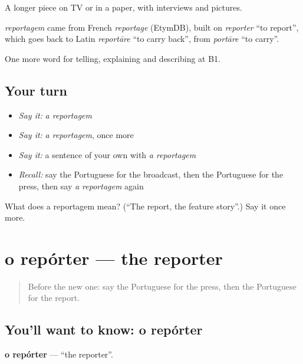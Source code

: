 A longer piece on TV or in a paper, with interviews and pictures.

\begin{cousinweb}
\emph{reportagem} came from French \emph{reportage} (EtymDB), built on \emph{reporter} \textquotedblleft{}to report\textquotedblright{}, which goes back to Latin \emph{reportāre} \textquotedblleft{}to carry back\textquotedblright{}, from \emph{portāre} \textquotedblleft{}to carry\textquotedblright{}.
\end{cousinweb}

\begin{grammarlens}[title={What you've built}]
One more word for telling, explaining and describing at B1.
\end{grammarlens}

\subsection*{Your turn}
\begin{itemize}
\raggedright
  \item \emph{Say it:} \emph{a reportagem}
  \item \emph{Say it:} \emph{a reportagem}, once more
  \item \emph{Say it:} a sentence of your own with \emph{a reportagem}
  \item \emph{Recall:} say the Portuguese for the broadcast, then the Portuguese for the press, then say \emph{a reportagem} again
\end{itemize}

\begin{tcolorbox}[breakable,colback=teal!4,colframe=teal!35!black,title={Before you move on}]
What does a reportagem mean? (\textquotedblleft{}The report, the feature story\textquotedblright{}.) Say it once more.
\end{tcolorbox}
\section[o repórter]{o repórter — the reporter}

\label{lesson:PT-C279-reporter}



\begin{quote}
Before the new one: say the Portuguese for the press, then the Portuguese for the report.
\end{quote}

\subsection*{You'll want to know: o repórter}
\textbf{o repórter} — \textquotedblleft{}the reporter\textquotedblright{}.

